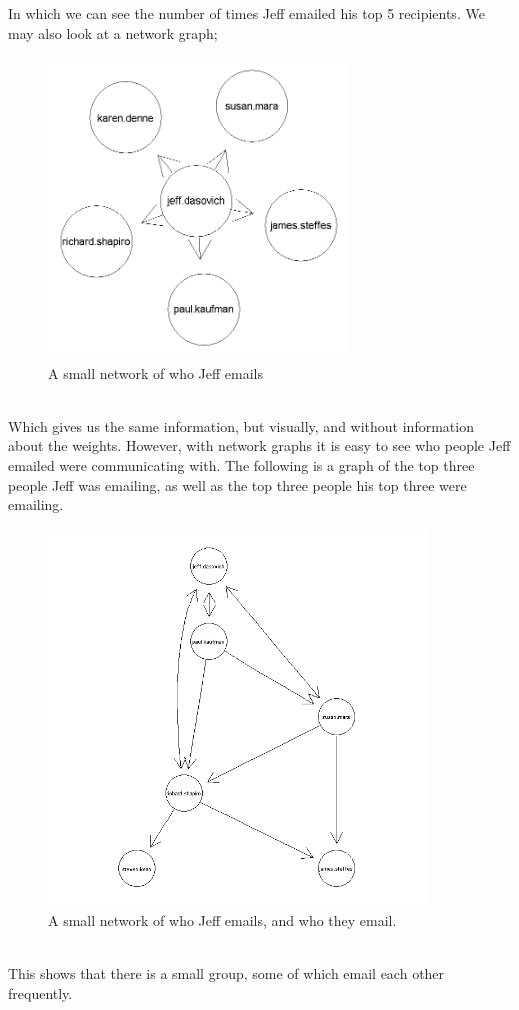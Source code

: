 \documentclass[12pt, a4paper, oneside]{amsart}
\begin{document}
In which we can see the number of times Jeff emailed his top 5 recipients.  We may also look at a network graph;
\begin{figure}[htp]
\centering
\includegraphics[width = 80mm]{JeffPlot.jpeg}
\caption{A small network of who Jeff emails}\label{fig:Small Jeff Network}
\end{figure}\\
Which gives us the same information, but visually, and without information about the weights.  However, with network graphs it is easy to see who people Jeff emailed were communicating with.  The following is a graph of the top three people Jeff was emailing, as well as the top three people his top three were emailing. 
\begin{figure}[htp]
\centering
\includegraphics[width = 100mm]{JeffPlot2.jpeg}
\caption{A small network of who Jeff emails, and who they email.}\label{fig:Large Jeff Network}
\end{figure}\\
This shows that there is a small group, some of which email each other frequently. \\ 
\end{document}
